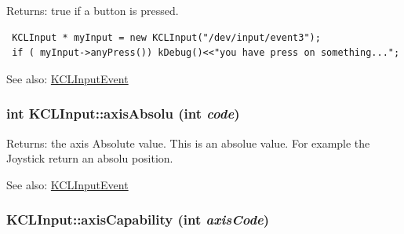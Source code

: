 \begin{Desc}
\item[Returns:]true if a button is pressed. 

\begin{Code}\begin{verbatim} KCLInput * myInput = new KCLInput("/dev/input/event3");
 if ( myInput->anyPress()) kDebug()<<"you have press on something...";
\end{verbatim}
\end{Code}

 \end{Desc}
\begin{Desc}
\item[See also:]\hyperlink{class_k_c_l_input_event}{KCLInputEvent} \end{Desc}
\hypertarget{class_k_c_l_input_5546e3862c917d07b22543190659871d}{
\subsubsection[{axisAbsolu}]{\setlength{\rightskip}{0pt plus 5cm}int KCLInput::axisAbsolu (int {\em code})}}
\label{class_k_c_l_input_5546e3862c917d07b22543190659871d}


\begin{Desc}
\item[Returns:]the axis Absolute value. This is an absolue value. For example the Joystick return an absolu position. \end{Desc}
\begin{Desc}
\item[See also:]\hyperlink{class_k_c_l_input_event}{KCLInputEvent} \end{Desc}
\hypertarget{class_k_c_l_input_72c70fa38d90216025a913a1255ce935}{
\subsubsection[{axisCapability}]{ KCLInput::axisCapability (int {\em axisCode})}}
\label{class_k_c_l_input_72c70fa38d90216025a913a1255ce935}


